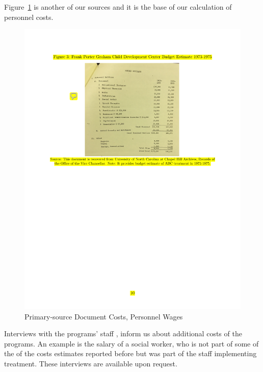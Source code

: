 \noindent Figure~\ref{figure:wages} is another of our sources and it is the base of our calculation of personnel costs.

\begin{center}
\begin{figure}[H] 
\caption{Primary-source Document Costs, Personnel Wages}
\label{figure:wages}
\centering
\includegraphics[width=.9\columnwidth]{AppOutput/Program/UNC-costs_budget.pdf}
\end{figure}
\end{center}

\noindent Interviews with the programs' staff \citet{projectcare2014interviews,abc2014-2015interviews}, inform us about additional costs of the programs. An example is the salary of a social worker, who is not part of some of the of the costs estimates reported before but was part of the staff implementing treatment. These interviews are available upon request.\\ 

